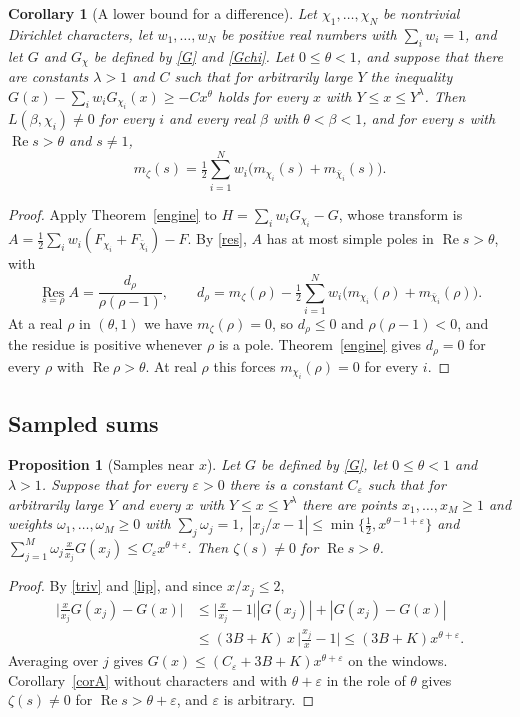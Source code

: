 \documentclass[11pt,letterpaper]{article}
\newtheorem{proposition}[theorem]{Proposition}
\newtheorem{corollary}[theorem]{Corollary}
\numberwithin{equation}{section}
\begin{document}
\begin{corollary}[A lower bound for a difference]\label{corB}
Let $\chi_1,\dots,\chi_N$ be nontrivial Dirichlet characters, let $w_1,\dots,w_N$ be positive real numbers with $\sum_iw_i=1$, and let $G$ and $G_\chi$ be defined by \eqref{G} and \eqref{Gchi}. Let $0\le\theta<1$, and suppose that there are constants $\lambda>1$ and $C$ such that for arbitrarily large $Y$ the inequality $G(x)-\sum_iw_iG_{\chi_i}(x)\ge-Cx^\theta$ holds for every $x$ with $Y\le x\le Y^\lambda$. Then $L(\beta,\chi_i)\ne0$ for every $i$ and every real $\beta$ with $\theta<\beta<1$, and for every $s$ with $\operatorname{Re}s>\theta$ and $s\ne1$,
\[
m_\zeta(s)=\tfrac12\sum_{i=1}^Nw_i\big(m_{\chi_i}(s)+m_{\bar\chi_i}(s)\big).
\]
\end{corollary}
\begin{proof}
Apply Theorem~\ref{engine} to $H=\sum_iw_iG_{\chi_i}-G$, whose transform is $A=\tfrac12\sum_iw_i(F_{\chi_i}+F_{\bar\chi_i})-F$. By \eqref{res}, $A$ has at most simple poles in $\operatorname{Re}s>\theta$, with
\[
\operatorname*{Res}_{s=\rho}A=\frac{d_\rho}{\rho(\rho-1)},\qquad d_\rho=m_\zeta(\rho)-\tfrac12\sum_{i=1}^Nw_i\big(m_{\chi_i}(\rho)+m_{\bar\chi_i}(\rho)\big).
\]
At a real $\rho$ in $(\theta,1)$ we have $m_\zeta(\rho)=0$, so $d_\rho\le0$ and $\rho(\rho-1)<0$, and the residue is positive whenever $\rho$ is a pole. Theorem~\ref{engine} gives $d_\rho=0$ for every $\rho$ with $\operatorname{Re}\rho>\theta$. At real $\rho$ this forces $m_{\chi_i}(\rho)=0$ for every $i$.
\end{proof}

\subsection{Sampled sums}

\begin{proposition}[Samples near $x$]\label{samp}
Let $G$ be defined by \eqref{G}, let $0\le\theta<1$ and $\lambda>1$. Suppose that for every $\varepsilon>0$ there is a constant $C_\varepsilon$ such that for arbitrarily large $Y$ and every $x$ with $Y\le x\le Y^\lambda$ there are points $x_1,\dots,x_M\ge1$ and weights $\omega_1,\dots,\omega_M\ge0$ with $\sum_j\omega_j=1$, $|x_j/x-1|\le\min\{\tfrac12,x^{\theta-1+\varepsilon}\}$ and $\sum_{j=1}^M\omega_j\frac{x}{x_j}G(x_j)\le C_\varepsilon x^{\theta+\varepsilon}$. Then $\zeta(s)\ne0$ for $\operatorname{Re}s>\theta$.
\end{proposition}
\begin{proof}
By \eqref{triv} and \eqref{lip}, and since $x/x_j\le2$,
\begin{align*}
\Big|\frac{x}{x_j}G(x_j)-G(x)\Big|&\le\Big|\frac{x}{x_j}-1\Big||G(x_j)|+|G(x_j)-G(x)|\\
&\le(3B+K)\,x\,\Big|\frac{x_j}{x}-1\Big|\le(3B+K)x^{\theta+\varepsilon}.
\end{align*}
Averaging over $j$ gives $G(x)\le(C_\varepsilon+3B+K)x^{\theta+\varepsilon}$ on the windows. Corollary~\ref{corA} without characters and with $\theta+\varepsilon$ in the role of $\theta$ gives $\zeta(s)\ne0$ for $\operatorname{Re}s>\theta+\varepsilon$, and $\varepsilon$ is arbitrary.
\end{proof}
\end{document}
